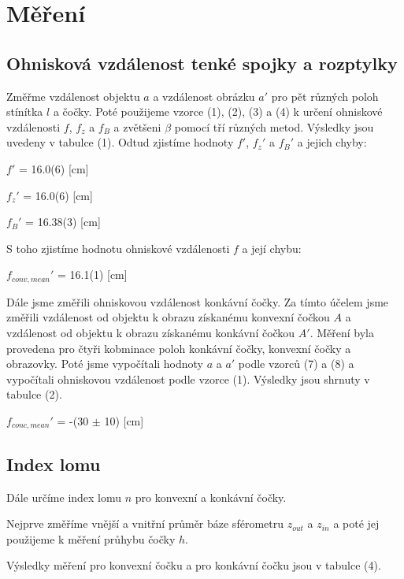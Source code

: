 \documentclass[a4paper,11pt]{article}
\begin{document}
    \hspace{10pt}
    \begin{minipage}[t]{0.5\textwidth} 
        \section{Měření}  
            \subsection{Ohnisková vzdálenost tenké spojky a rozptylky}
                Změřme vzdálenost objektu $a$ a vzdálenost obrázku $a'$ pro pět různých poloh stínítka $l$ a čočky. Poté použijeme vzorce (1), (2), (3) a (4) k určení ohniskové vzdálenosti $f$, $f_z$ a $f_B$ a zvětšeni $\beta$ pomocí tří různých metod. Výsledky jsou uvedeny v tabulce (1).
                Odtud zjistíme hodnoty $f'$, $f_z'$ a $f_B'$ a jejich chyby: 
                \begin{center}
                    $f'$ = 16.0(6) [cm]
                    \vspace{5pt}
                    \par $f_z'$ = 16.0(6) [cm]
                    \vspace{5pt}
                    \par $f_B'$ = 16.38(3) [cm]
                \end{center}
                S toho zjistíme hodnotu ohniskové vzdálenosti $f$ a její chybu:
                \begin{center}
                    $f_{conv, mean}'$ = 16.1(1) [cm]
                \end{center}
                Dále jsme změřili ohniskovou vzdálenost konkávní čočky. Za tímto účelem jsme změřili vzdálenost od objektu k obrazu získanému konvexní čočkou $A$ a vzdálenost od objektu k obrazu získanému konkávní čočkou $A'$. Měření byla provedena pro čtyři kobminace poloh konkávní čočky, konvexní čočky a obrazovky. Poté jsme vypočítali hodnoty $a$ a $a'$ podle vzorců (7) a (8) a vypočítali ohniskovou vzdálenost podle vzorce (1). Výsledky jsou shrnuty v tabulce (2).     
                \begin{center}
                    $f_{conc, mean}'$ = -(30 $\pm$ 10) [cm]
                \end{center}
                \subsection{Index lomu}
                Dále určíme index lomu $n$ pro konvexní a konkávní čočky. 
                \par Nejprve změříme vnější a vnitřní průměr báze sférometru $z_{out}$ a $z_{in}$ a poté jej použijeme k měření průhybu čočky $h$.
                \par Výsledky měření pro konvexní čočku a pro konkávní čočku jsou v tabulce (4).    
    \end{minipage}   
\end{document}
